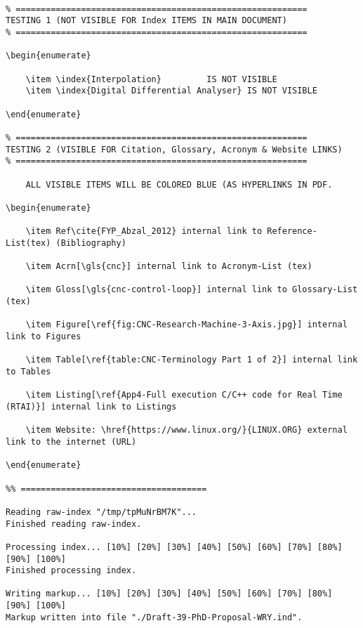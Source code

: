 \begin{lstlisting}[caption={Advice on Latex codes for making links}, label=lst:Advice on Latex codes for making links]

% ==========================================================
TESTING 1 (NOT VISIBLE FOR Index ITEMS IN MAIN DOCUMENT)
% ==========================================================

\begin{enumerate}

	\item \index{Interpolation}			IS NOT VISIBLE
	\item \index{Digital Differential Analyser}	IS NOT VISIBLE
	
\end{enumerate}

% ==========================================================	
TESTING 2 (VISIBLE FOR Citation, Glossary, Acronym & Website LINKS)
% ==========================================================

	ALL VISIBLE ITEMS WILL BE COLORED BLUE (AS HYPERLINKS IN PDF.

\begin{enumerate}
		
	\item Ref\cite{FYP_Abzal_2012} internal link to Reference-List(tex) (Bibliography)
	
	\item Acrn[\gls{cnc}] internal link to Acronym-List (tex)
	
	\item Gloss[\gls{cnc-control-loop}] internal link to Glossary-List (tex)
	
	\item Figure[\ref{fig:CNC-Research-Machine-3-Axis.jpg}] internal link to Figures 

	\item Table[\ref{table:CNC-Terminology Part 1 of 2}] internal link to Tables

	\item Listing[\ref{App4-Full execution C/C++ code for Real Time (RTAI)}] internal link to Listings 
	
	\item Website: \href{https://www.linux.org/}{LINUX.ORG} external link to the internet (URL)

\end{enumerate}

%% =====================================

Reading raw-index "/tmp/tpMuNrBM7K"...
Finished reading raw-index.

Processing index... [10%] [20%] [30%] [40%] [50%] [60%] [70%] [80%] [90%] [100%]
Finished processing index.

Writing markup... [10%] [20%] [30%] [40%] [50%] [60%] [70%] [80%] [90%] [100%]
Markup written into file "./Draft-39-PhD-Proposal-WRY.ind".

\end{lstlisting}	

